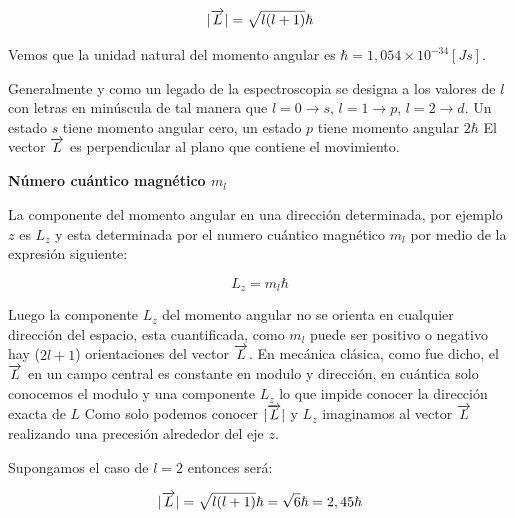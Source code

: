 \begin{equation}
	\vert\overrightarrow{L}\vert = \sqrt{l(l+1)} \hbar
\end{equation}

Vemos que la unidad natural del momento angular es $\hbar= 1,054 \times 10^{−34}[Js]$.

Generalmente y como un legado de la espectroscopia se designa a los valores de $l$ con letras en minúscula de tal manera que $l=0\rightarrow s$, $l=1\rightarrow p$, $l=2\rightarrow d$. Un estado $s$ tiene momento angular cero, un estado $p$ tiene momento angular $2\hbar$ El vector $\overrightarrow{L}$ es perpendicular al plano que contiene el movimiento.

\textbf{Número cuántico magnético $m_{l}$}

La componente del momento angular en una dirección determinada, por ejemplo $z$ es $L_{z}$ y esta determinada por el numero cuántico magnético $m_{l}$ por medio de la expresión siguiente: 

\begin{equation}
	L_{z}= m_{l} \hbar
\end{equation}

Luego la componente $L_{z}$ del momento angular no se orienta en cualquier dirección del espacio, esta cuantificada, como $m_{l}$ puede ser positivo o negativo hay ($2l+1$) orientaciones del vector $\overrightarrow{L}$. En mecánica clásica, como fue dicho, el $\overrightarrow{L}$ en un campo central es constante en modulo y dirección, en cuántica solo conocemos el modulo y una componente $L_{z}$ lo que impide conocer la dirección exacta de $L$ Como solo podemos conocer $\vert\overrightarrow{L}\vert$ y $L_{z}$ imaginamos al vector $\overrightarrow{L}$ realizando una precesión alrededor del eje $z$.
 
Supongamos el caso de $l=2$ entonces será:

\begin{equation*}
	\vert\overrightarrow{L}\vert = \sqrt{l(l+1)} \hbar = \sqrt{6}\hbar = 2,45\hbar
\end{equation*}




